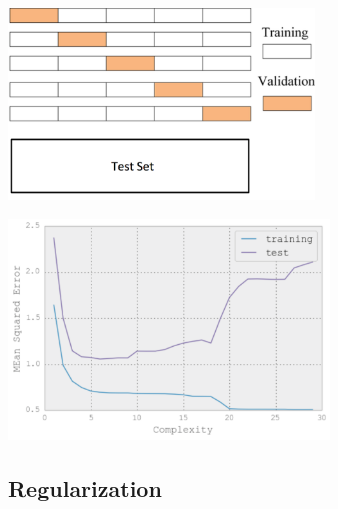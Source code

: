 \documentclass[11pt, oneside]{article}
\begin{document}
\vspace{-.5em}

\noindent \begin{minipage}{0.5\linewidth} 
\vspace{.4em}
\includegraphics[width=3.2in]{kfold.png}\\
\vspace{.1em}

\end{minipage}
\begin{minipage}{0.5\linewidth} 
\includegraphics[width=3.35in]{kfolds2.png}
\end{minipage}


\subsection{Regularization}
\end{document}
